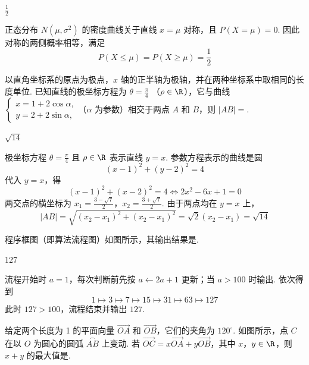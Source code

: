\begin{answer}
\(\frac{1}{2}\)
\end{answer}

\begin{solution}
正态分布 \(N(\mu,\sigma^2)\) 的密度曲线关于直线 \(x=\mu\) 对称，且 \(P(X=\mu)=0\). 因此对称的两侧概率相等，满足
\[
P(X\leqslant\mu)=P(X\geqslant\mu)=\frac{1}{2}
\]
\end{solution}

\begin{problem}
以直角坐标系的原点为极点，\(x\) 轴的正半轴为极轴，并在两种坐标系中取相同的长度单位. 已知直线的极坐标方程为 \(\theta = \frac{\pi}{4}\) （\(\rho \in \R\)），它与曲线 \(\begin{cases}
x = 1 + 2\cos \alpha,\\
y = 2 + 2\sin \alpha,
\end{cases}\)（\(\alpha\) 为参数）相交于两点 \(A\) 和 \(B\)，则 \(|AB| =\)\fillinblank{}.
\end{problem}

\begin{answer}
\(\sqrt{14}\)
\end{answer}

\begin{solution}
极坐标方程 \(\theta=\frac{\pi}{4}\) 且 \(\rho\in\R\) 表示直线 \(y=x\). 参数方程表示的曲线是圆
\[
(x-1)^2+(y-2)^2=4
\]
代入 \(y=x\)，得
\[
(x-1)^2+(x-2)^2=4
\Longleftrightarrow 2x^2-6x+1=0
\]
两交点的横坐标为
\(x_1=\frac{3-\sqrt{7}}{2}\)，\(x_2=\frac{3+\sqrt{7}}{2}\).
由于两点均在 \(y=x\) 上，
\[
|AB|=\sqrt{(x_2-x_1)^2+(x_2-x_1)^2}=\sqrt{2}(x_2-x_1)=\sqrt{14}
\]
\end{solution}

\begin{problem}
程序框图（即算法流程图）如图所示，其输出结果是\fillinblank{}.

\end{problem}

\begin{answer}
127
\end{answer}

\begin{solution}
流程开始时 \(a=1\)，每次判断前先按 \(a\leftarrow2a+1\) 更新；当 \(a>100\) 时输出. 依次得到
\[
1\longmapsto3\longmapsto7\longmapsto15\longmapsto31\longmapsto63\longmapsto127
\]
此时 \(127>100\)，流程结束并输出 \(127\).
\end{solution}

\begin{problem}
给定两个长度为 1 的平面向量 \(\overrightarrow{OA}\) 和 \(\overrightarrow{OB}\)，它们的夹角为 \(120^{\circ}\). 如图所示，点 \(C\) 在以 \(O\) 为圆心的圆弧 \(\overset{\frown}{AB}\) 上变动. 若 \(\overrightarrow{OC} = x\overrightarrow{OA} + y\overrightarrow{OB}\)，其中 \(x\)，\(y\in\R\)，则 \(x + y\) 的最大值是\fillinblank{}.

\end{problem}

